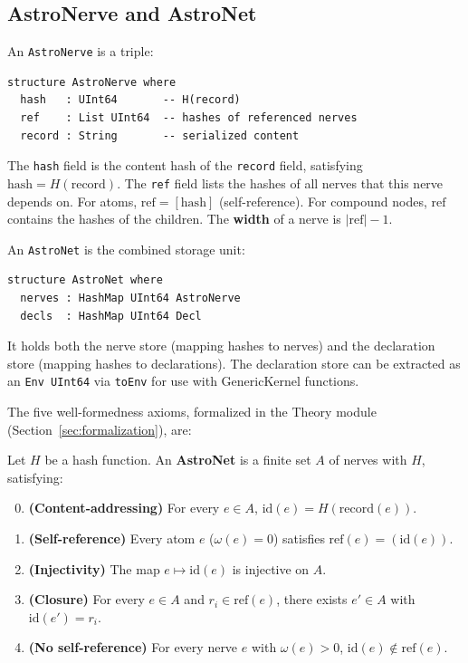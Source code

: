 \subsection{AstroNerve and AstroNet}\label{sec:astronerve}

An \texttt{AstroNerve} is a triple:

\begin{lstlisting}[language={},morekeywords={structure,where,deriving}]
structure AstroNerve where
  hash   : UInt64       -- H(record)
  ref    : List UInt64  -- hashes of referenced nerves
  record : String       -- serialized content
\end{lstlisting}

The \texttt{hash} field is the content hash of the \texttt{record} field, satisfying $\mathrm{hash} = H(\mathrm{record})$.  The \texttt{ref} field lists the hashes of all nerves that this nerve depends on.  For atoms, $\mathrm{ref} = [\mathrm{hash}]$ (self-reference).  For compound nodes, $\mathrm{ref}$ contains the hashes of the children.  The \textbf{width} of a nerve is $|\mathrm{ref}| - 1$.

An \texttt{AstroNet} is the combined storage unit:

\begin{lstlisting}[language={},morekeywords={structure,where,deriving}]
structure AstroNet where
  nerves : HashMap UInt64 AstroNerve
  decls  : HashMap UInt64 Decl
\end{lstlisting}

It holds both the nerve store (mapping hashes to nerves) and the declaration store (mapping hashes to declarations).  The declaration store can be extracted as an \texttt{Env UInt64} via \texttt{toEnv} for use with GenericKernel functions.

The five well-formedness axioms, formalized in the Theory module (Section~\ref{sec:formalization}), are:

\begin{definition}[AstroNet]\label{def:ca-hypergraph}\label{def:well-formed}
Let $H$ be a hash function.  An \textbf{AstroNet} is a finite set $A$ of nerves with $H$, satisfying:
\begin{enumerate}
  \setcounter{enumi}{-1}
  \item \textbf{(Content-addressing)} For every $e \in A$, $\mathrm{id}(e) = H(\mathrm{record}(e))$.
  \item \textbf{(Self-reference)} Every atom $e$ ($\omega(e) = 0$) satisfies $\mathrm{ref}(e) = (\mathrm{id}(e))$.
  \item \textbf{(Injectivity)} The map $e \mapsto \mathrm{id}(e)$ is injective on $A$.
  \item \textbf{(Closure)} For every $e \in A$ and $r_i \in \mathrm{ref}(e)$, there exists $e' \in A$ with $\mathrm{id}(e') = r_i$.
  \item \textbf{(No self-reference)} For every nerve $e$ with $\omega(e) > 0$, $\mathrm{id}(e) \notin \mathrm{ref}(e)$.
\end{enumerate}
\end{definition}

